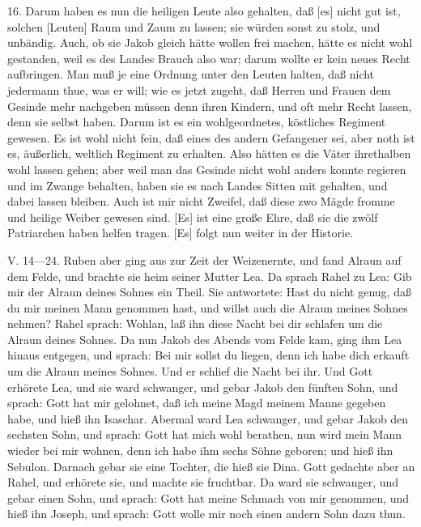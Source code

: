 16. Darum haben es nun die heiligen Leute also gehalten, daß [es] nicht gut ist, solchen [Leuten] Raum und Zaum zu lassen; sie würden sonst zu stolz, und unbändig. Auch, ob sie Jakob gleich hätte wollen frei machen, hätte es nicht wohl gestanden, weil es des Landes Brauch also war; darum wollte er kein neues Recht aufbringen. Man muß je eine Ordnung unter den Leuten halten, daß nicht jedermann thue, was er will; wie es jetzt zugeht, daß Herren und Frauen dem Gesinde mehr nachgeben müssen denn ihren Kindern, und oft mehr Recht lassen, denn sie selbst haben. Darum ist es ein wohlgeordnetes, köstliches Regiment gewesen. Es ist wohl nicht fein, daß eines des andern Gefangener sei, aber noth ist es, äußerlich, weltlich Regiment zu erhalten. Also hätten es die Väter ihrethalben wohl lassen gehen; aber weil man das Gesinde nicht wohl anders konnte regieren und im Zwange behalten, haben sie es nach Landes Sitten mit gehalten, und dabei lassen bleiben. Auch ist mir nicht Zweifel, daß diese zwo Mägde fromme und heilige Weiber gewesen sind. [Es] ist eine große Ehre, daß sie die zwölf Patriarchen haben helfen tragen. [Es] folgt nun weiter in der Historie.

V. 14—24. Ruben aber ging aus zur Zeit der Weizenernte, und fand Alraun auf dem Felde, und brachte sie heim seiner Mutter Lea. Da sprach Rahel zu Lea: Gib mir der Alraun deines Sohnes ein Theil. Sie antwortete: Hast du nicht genug, daß du mir meinen Mann genommen hast, und willst auch die Alraun meines Sohnes nehmen? Rahel sprach: Wohlan, laß ihn diese Nacht bei dir schlafen um die Alraun deines Sohnes. Da nun Jakob des Abends vom Felde kam, ging ihm Lea hinaus entgegen, und sprach: Bei mir sollst du liegen, denn ich habe dich erkauft um die Alraun meines Sohnes. Und er schlief die Nacht bei ihr. Und Gott erhörete Lea, und sie ward schwanger, und gebar Jakob den fünften Sohn, und sprach: Gott hat mir gelohnet, daß ich meine Magd meinem Manne gegeben habe, und hieß ihn Isaschar. Abermal ward Lea schwanger, und gebar Jakob den sechsten Sohn, und sprach: Gott hat mich wohl berathen, nun wird mein Mann wieder bei mir wohnen, denn ich habe ihm sechs Söhne geboren; und hieß ihn Sebulon. Darnach gebar sie eine Tochter, die hieß sie Dina. Gott gedachte aber an Rahel, und erhörete sie, und machte sie fruchtbar. Da ward sie schwanger, und gebar einen Sohn, und sprach: Gott hat meine Schmach von mir genommen, und hieß ihn Joseph, und sprach: Gott wolle mir noch einen andern Sohn dazu thun.


